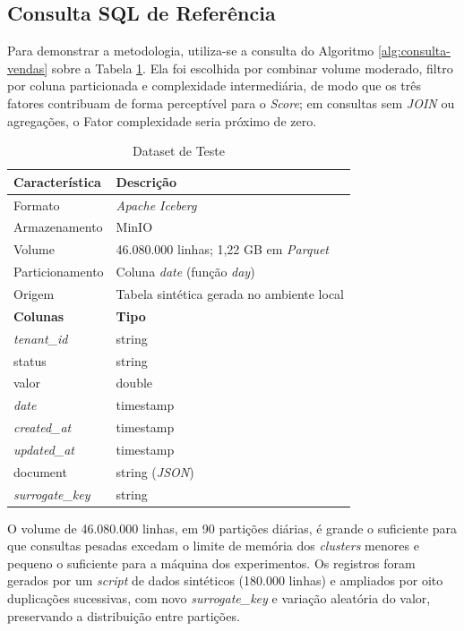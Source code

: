 \subsection{Consulta SQL de Referência}

Para demonstrar a metodologia, utiliza-se a consulta do Algoritmo \ref{alg:consulta-vendas} sobre a Tabela \ref{tab:dataset-teste}. Ela foi escolhida por combinar volume moderado, filtro por coluna particionada e complexidade intermediária, de modo que os três fatores contribuam de forma perceptível para o \textit{Score}; em consultas sem \textit{JOIN} ou agregações, o Fator complexidade seria próximo de zero.

\begin{table}[H]
	\centering
	\caption{Dataset de Teste}
	\label{tab:dataset-teste}
	\begin{tabular}{ll}
	\hline
	\textbf{Característica} & \textbf{Descrição} \\
	\hline
	Formato & \textit{Apache Iceberg} \\
	Armazenamento & MinIO \\
	Volume & 46.080.000 linhas; 1,22 GB em \textit{Parquet} \\
	Particionamento & Coluna \textit{date} (função \textit{day}) \\
	Origem & Tabela sintética gerada no ambiente local \\
	\hline
	\textbf{Colunas} & \textbf{Tipo} \\
	\hline
	\textit{tenant\_id} & string \\
	status & string \\
	valor & double \\
	\textit{date} & timestamp \\
	\textit{created\_at} & timestamp \\
	\textit{updated\_at} & timestamp \\
	document & string (\textit{JSON}) \\
	\textit{surrogate\_key} & string \\
	\hline
	\end{tabular}
\end{table}

O volume de 46.080.000 linhas, em 90 partições diárias, é grande o suficiente para que consultas pesadas excedam o limite de memória dos \textit{clusters} menores e pequeno o suficiente para a máquina dos experimentos. Os registros foram gerados por um \textit{script} de dados sintéticos (180.000 linhas) e ampliados por oito duplicações sucessivas, com novo \textit{surrogate\_key} e variação aleatória do valor, preservando a distribuição entre partições.

